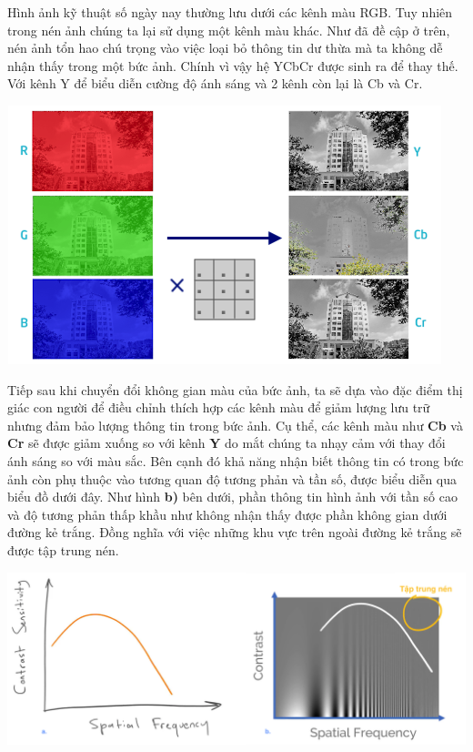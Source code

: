 \documentclass[12pt,a4paper]{article}
\begin{document}
Hình ảnh kỹ thuật số ngày nay thường lưu dưới các kênh màu RGB. Tuy nhiên trong nén ảnh chúng ta lại sử dụng một kênh màu khác. Như đã đề cập ở trên, nén ảnh tổn hao chú trọng vào việc loại bỏ thông tin dư thừa mà ta không dễ nhận thấy trong một bức ảnh. Chính vì vậy hệ YCbCr được sinh ra để thay thế. Với kênh Y để biểu diễn cường độ ánh sáng và 2 kênh còn lại là Cb và Cr.

\begin{center}
\includegraphics[scale=0.65]{ColorSpaceConversion.png}
\end{center}

Tiếp sau khi chuyển đổi không gian màu của bức ảnh, ta sẽ dựa vào đặc điểm thị giác con người để điều chỉnh thích hợp các kênh màu để giảm lượng lưu trữ nhưng đảm bảo lượng thông tin trong bức ảnh. Cụ thể, các kênh màu như \textbf{Cb} và \textbf{Cr} sẽ được giảm xuống so với kênh \textbf{Y} do mắt chúng ta nhạy cảm với thay đổi ánh sáng so với màu sắc. Bên cạnh đó khả năng nhận biết thông tin có trong bức ảnh còn phụ thuộc vào tương quan độ tương phản và tần số, được biểu diễn qua biểu đồ dưới đây. Như hình \textbf{b)} bên dưới, phần thông tin hình ảnh với tần số cao và độ tương phản thấp khầu như không nhận thấy được phần không gian dưới đường kẻ trắng. Đồng nghĩa với việc những khu vực trên ngoài đường kẻ trắng sẽ được tập trung nén.
\begin{center}
\includegraphics[scale=0.25]{frequencyandcontrast.png}
\end{center}
\end{document}
